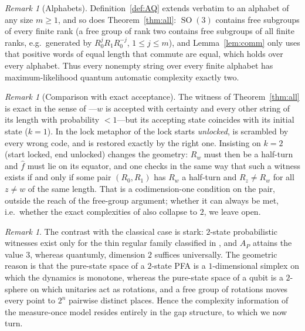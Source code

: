 \documentclass[11pt]{amsart}
\theoremstyle{definition}
\theoremstyle{remark}
\newtheorem{remark}[theorem]{Remark}
\newcommand{\AP}{A_P}
\DeclareMathOperator{\SO}{SO}
\begin{document}
\begin{remark}[Alphabets]\label{rem:alphabets}
Definition~\ref{def:AQ} extends verbatim to an alphabet of any size
$m\ge1$, and so does Theorem~\ref{thm:all}: $\SO(3)$ contains free
subgroups of every finite rank (a free group of rank two contains
free subgroups of all finite ranks, e.g.\ generated by
$R_0^jR_1R_0^{-j}$, $1\le j\le m$), and Lemma~\ref{lem:comm} only uses
that positive words of equal length that commute are equal, which
holds over every alphabet. Thus every nonempty string over every
finite alphabet has maximum-likelihood quantum automatic complexity
exactly two.
\end{remark}

\begin{remark}[Comparison with exact acceptance]\label{rem:lock}
The witness of Theorem~\ref{thm:all} is exact in the sense of
\cite{KH17}---$w$ is accepted with certainty and every other string of
its length with probability $<1$---but its accepting state coincides
with its initial state ($k=1$). In the lock metaphor of \cite{KH17}
the lock starts \emph{unlocked}, is scrambled by every wrong code, and
is restored exactly by the right one. Insisting on $k=2$ (start
locked, end unlocked) changes the geometry: $R_w$ must then be a
half-turn and $\hat f$ must lie on its equator, and one checks in the
same way that such a witness exists if and only if some pair
$(R_0,R_1)$ has $R_w$ a half-turn and $R_z\ne R_w$ for all $z\ne w$
of the same length. That is a codimension-one condition on the pair,
outside the reach of the free-group argument; whether it can always be
met, i.e.\ whether the exact complexities of \cite{KH17} also collapse
to $2$, we leave open.
\end{remark}

\begin{remark}
The contrast with the classical case is stark: $2$-state probabilistic
witnesses exist only for the thin regular family classified in
\cite[Theorem~4.1]{Gill24}, and $\AP$ attains the value $3$, whereas
quantumly, dimension $2$ suffices universally. The geometric reason
is that the pure-state space of a $2$-state PFA is a $1$-dimensional
simplex on which the dynamics is monotone, whereas the pure-state
space of a qubit is a $2$-sphere on which unitaries act as rotations,
and a free group of rotations moves every point to $2^n$ pairwise
distinct places. Hence the complexity information of the measure-once
model resides entirely in the gap structure, to which we now turn.
\end{remark}
\end{document}
